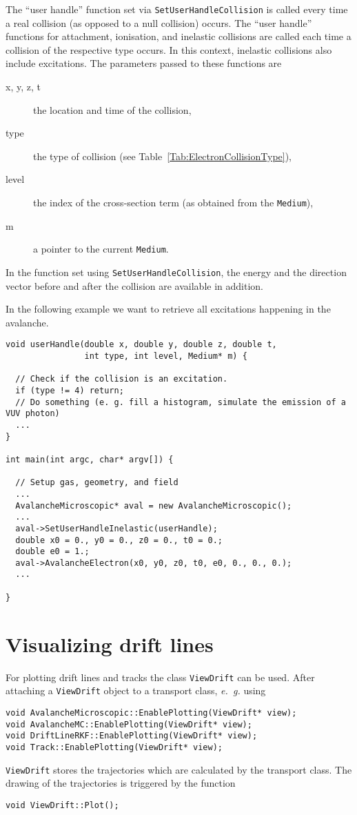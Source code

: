 The ``user handle'' function set via \texttt{SetUserHandleCollision} 
is called every time a real collision (as opposed to a null collision) occurs.
The ``user handle'' functions for attachment, ionisation, and inelastic collisions 
are called each time a collision of the respective type occurs.  
In this context, inelastic collisions also include excitations. 
The parameters passed to these functions are 
\begin{description}
  \item[x, y, z, t]
  the location and time of the collision, 
  \item[type]
  the type of collision (see Table~\ref{Tab:ElectronCollisionType}), 
  \item[level]
  the index of the cross-section term (as obtained from the \texttt{Medium}),
  \item[m]
   a pointer to the current \texttt{Medium}. 
\end{description}
In the function set using \texttt{SetUserHandleCollision}, the energy 
and the direction vector before and after the collision are available 
in addition. 

In the following example we want to retrieve  
all excitations happening in the avalanche.
\begin{lstlisting}
void userHandle(double x, double y, double z, double t,
                int type, int level, Medium* m) {

  // Check if the collision is an excitation.
  if (type != 4) return;
  // Do something (e. g. fill a histogram, simulate the emission of a VUV photon) 
  ...
} 

int main(int argc, char* argv[]) {

  // Setup gas, geometry, and field
  ...
  AvalancheMicroscopic* aval = new AvalancheMicroscopic();
  ...
  aval->SetUserHandleInelastic(userHandle);
  double x0 = 0., y0 = 0., z0 = 0., t0 = 0.;
  double e0 = 1.;
  aval->AvalancheElectron(x0, y0, z0, t0, e0, 0., 0., 0.); 
  ...

}

\end{lstlisting}
 
\section{Visualizing drift lines}

For plotting drift lines and tracks the class \texttt{ViewDrift} can be used. 
After attaching a \texttt{ViewDrift} object to a transport class, 
\textit{e.~g.} using
\begin{lstlisting}
void AvalancheMicroscopic::EnablePlotting(ViewDrift* view);
void AvalancheMC::EnablePlotting(ViewDrift* view);
void DriftLineRKF::EnablePlotting(ViewDrift* view);
void Track::EnablePlotting(ViewDrift* view);
\end{lstlisting}
\texttt{ViewDrift} stores the trajectories which are calculated by the 
transport class. 
The drawing of the trajectories is triggered by the function
\begin{lstlisting}
void ViewDrift::Plot();
\end{lstlisting}

